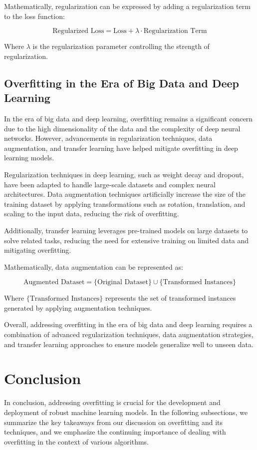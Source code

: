 \documentclass[12pt]{book} %
\begin{document}
Mathematically, regularization can be expressed by adding a regularization term to the loss function:

\[
\text{Regularized Loss} = \text{Loss} + \lambda \cdot \text{Regularization Term}
\]

Where $\lambda$ is the regularization parameter controlling the strength of regularization.

\subsection{Overfitting in the Era of Big Data and Deep Learning}

In the era of big data and deep learning, overfitting remains a significant concern due to the high dimensionality of the data and the complexity of deep neural networks. However, advancements in regularization techniques, data augmentation, and transfer learning have helped mitigate overfitting in deep learning models.

Regularization techniques in deep learning, such as weight decay and dropout, have been adapted to handle large-scale datasets and complex neural architectures. Data augmentation techniques artificially increase the size of the training dataset by applying transformations such as rotation, translation, and scaling to the input data, reducing the risk of overfitting.

Additionally, transfer learning leverages pre-trained models on large datasets to solve related tasks, reducing the need for extensive training on limited data and mitigating overfitting.

Mathematically, data augmentation can be represented as:

\[
\text{Augmented Dataset} = \{\text{Original Dataset}\} \cup \{\text{Transformed Instances}\}
\]

Where $\{\text{Transformed Instances}\}$ represents the set of transformed instances generated by applying augmentation techniques.

Overall, addressing overfitting in the era of big data and deep learning requires a combination of advanced regularization techniques, data augmentation strategies, and transfer learning approaches to ensure models generalize well to unseen data.

\section{Conclusion}

In conclusion, addressing overfitting is crucial for the development and deployment of robust machine learning models. In the following subsections, we summarize the key takeaways from our discussion on overfitting and its techniques, and we emphasize the continuing importance of dealing with overfitting in the context of various algorithms.
\end{document}

